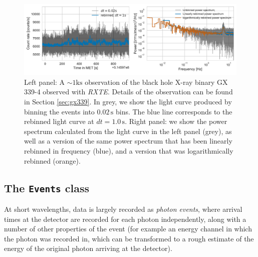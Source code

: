\documentclass[twocolumn]{aastex62}
\newcommand{\project}[1]{\textsl{#1}\xspace}
\newcommand{\rxte}{\project{RXTE}\xspace}
\begin{document}
\begin{figure}[htbp]
\begin{center}
\includegraphics[width=\textwidth]{../figures/example_lc_ps.pdf}
\caption{Left panel: A $\sim 1 \mathrm{ks}$ observation of the black hole X-ray binary GX 339-4 observed with \rxte. Details of the observation can be found in Section \ref{sec:gx339}. In grey, we show the light curve produced by binning the events into $0.02\,\mathrm{s}$ bins. The blue line corresponds to the rebinned light curve at $dt = 1.0\,\mathrm{s}$. Right panel: we show the power spectrum calculated from the light curve in the left panel (grey), as well as a version of the same power spectrum that has been linearly rebinned in frequency (blue), and a version that was logarithmically rebinned (orange).}
\label{fig:psd}
\end{center}
\end{figure}

\subsection{The \texttt{Events} class}

At short wavelengths, data is largely recorded as \textit{photon events}, where arrival times at the detector are recorded for each photon independently, along with a number of other properties of the event (for example an energy channel in which the photon was recorded in, which can be transformed to a rough estimate of the energy of the original photon arriving at the detector).
\end{document}
